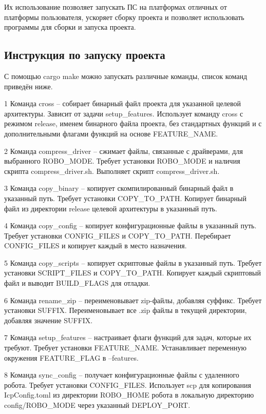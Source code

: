 Их использование позволяет запускать ПС на платформах отличных от
платформы пользователя, ускоряет сборку проекта и позволяет использовать
программы для сборки и запуска проекта.


\subsection{Инструкция по запуску проекта}
С помощью cargo make можно запускать различные команды, список команд приведён ниже.

1 Команда {cross} -- собирает бинарный файл проекта для указанной целевой
архитектуры. Зависит от задачи setup\_features. Использует команду cross с
режимом release, именем бинарного файла проекта, без стандартных функций и с
дополнительными флагами функций на основе FEATURE\_NAME.

2 Команда  {compress\_driver} -- сжимает файлы, связанные с драйверами, для
выбранного ROBO\_MODE. Требует установки ROBO\_MODE и наличия скрипта
compress\_driver.sh. Выполняет скрипт compress\_driver.sh.

3 Команда   {copy\_binary} -- копирует скомпилированный бинарный файл в указанный
путь. Требует установки COPY\_TO\_PATH. Копирует бинарный файл из директории
release целевой архитектуры в указанный путь.

4 Команда    {copy\_config} -- копирует конфигурационные файлы в указанный путь.
Требует установки CONFIG\_FILES и COPY\_TO\_PATH. Перебирает CONFIG\_FILES и
копирует каждый в место назначения.

5 Команда     {copy\_scripts} -- копирует скриптовые файлы в указанный путь. Требует
установки SCRIPT\_FILES и COPY\_TO\_PATH. Копирует каждый скриптовый файл и
выводит BUILD\_FLAGS для отладки.

6 Команда      {rename\_zip} -- переименовывает zip-файлы, добавляя суффикс. Требует
установки SUFFIX. Переименовывает все .zip файлы в текущей директории,
добавляя значение SUFFIX.

7 Команда       {setup\_features} -- настраивает флаги функций для задач, которые их
требуют. Требует установки FEATURE\_NAME. Устанавливает переменную окружения
FEATURE\_FLAG в --features.

8  Команда       {sync\_config} -- получает конфигурационные файлы с удаленного робота.
Требует установки CONFIG\_FILES. Использует scp для копирования
IcpConfig.toml из директории ROBO\_HOME робота в локальную директорию
config/ROBO\_MODE через указанный DEPLOY\_PORT.

